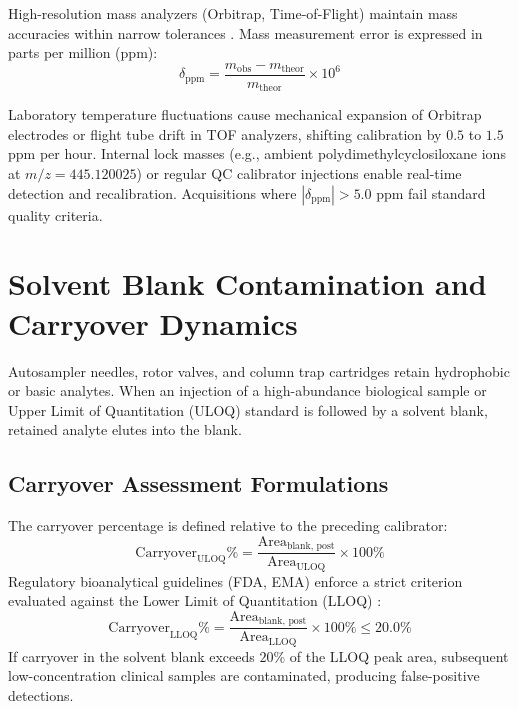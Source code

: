 \documentclass[11pt,twoside,openright]{book}
\begin{document}
High-resolution mass analyzers (Orbitrap, Time-of-Flight) maintain mass accuracies within narrow tolerances \cite{gross2017mass, zubarev2007persistent}. Mass measurement error is expressed in parts per million (ppm):
\begin{equation}
\delta_{\text{ppm}} = \frac{m_{\text{obs}} - m_{\text{theor}}}{m_{\text{theor}}} \times 10^6
\end{equation}

Laboratory temperature fluctuations cause mechanical expansion of Orbitrap electrodes or flight tube drift in TOF analyzers, shifting calibration by $0.5$ to $1.5$ ppm per hour. Internal lock masses (e.g., ambient polydimethylcyclosiloxane ions at $m/z = 445.120025$) or regular QC calibrator injections enable real-time detection and recalibration. Acquisitions where $|\delta_{\text{ppm}}| > 5.0$ ppm fail standard quality criteria.

\section{Solvent Blank Contamination and Carryover Dynamics}
\label{sec:blank_carryover}

Autosampler needles, rotor valves, and column trap cartridges retain hydrophobic or basic analytes. When an injection of a high-abundance biological sample or Upper Limit of Quantitation (ULOQ) standard is followed by a solvent blank, retained analyte elutes into the blank.

\subsection{Carryover Assessment Formulations}

The carryover percentage is defined relative to the preceding calibrator:
\begin{equation}
\text{Carryover}_{\text{ULOQ}}\% = \frac{\text{Area}_{\text{blank, post}}}{\text{Area}_{\text{ULOQ}}} \times 100\%
\end{equation}
Regulatory bioanalytical guidelines (FDA, EMA) enforce a strict criterion evaluated against the Lower Limit of Quantitation (LLOQ) \cite{fda2018bioanalytical, ema2011bioanalytical, booth2011workshop}:
\begin{equation}
\text{Carryover}_{\text{LLOQ}}\% = \frac{\text{Area}_{\text{blank, post}}}{\text{Area}_{\text{LLOQ}}} \times 100\% \le 20.0\%
\end{equation}
If carryover in the solvent blank exceeds $20\%$ of the LLOQ peak area, subsequent low-concentration clinical samples are contaminated, producing false-positive detections.
\end{document}
